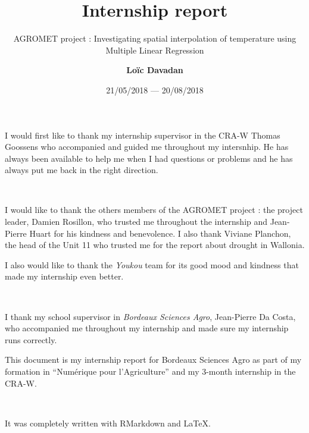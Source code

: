 \documentclass[12pt,twoside]{reedthesis}
\title{Internship report}
\author{\textbf{Loïc Davadan}}
\date{21/05/2018 --- 20/08/2018}
\subtitle{AGROMET project : Investigating spatial interpolation of temperature
using Multiple Linear Regression}
\theoremstyle{definition}
\theoremstyle{definition}
\theoremstyle{definition}
\theoremstyle{remark}
\begin{document}
  \maketitle

\frontmatter %
\pagestyle{empty} %
  \begin{acknowledgements}
    I would first like to thank my internship supervisor in the CRA-W Thomas
    Goossens who accompanied and guided me throughout my intersnhip. He has
    always been available to help me when I had questions or problems and he
    has always put me back in the right direction.
    
    ~
    
    I would like to thank the others members of the AGROMET project : the
    project leader, Damien Rosillon, who trusted me throughout the
    internship and Jean-Pierre Huart for his kindness and benevolence. I
    also thank Viviane Planchon, the head of the Unit 11 who trusted me for
    the report about drought in Wallonia.
    
    I also would like to thank the \emph{Youkou} team for its good mood and
    kindness that made my internship even better.
    
    ~
    
    I thank my school supervisor in \emph{Bordeaux Sciences Agro},
    Jean-Pierre Da Costa, who accompanied me throughout my internship and
    made sure my internship runs correctly.
  \end{acknowledgements}
  \begin{preface}
    This document is my internship report for Bordeaux Sciences Agro as part
    of my formation in ``Numérique pour l'Agriculture'' and my 3-month
    internship in the CRA-W.
    
    ~
    
    It was completely written with RMarkdown and \LaTeX.
  \end{preface}
\end{document}
